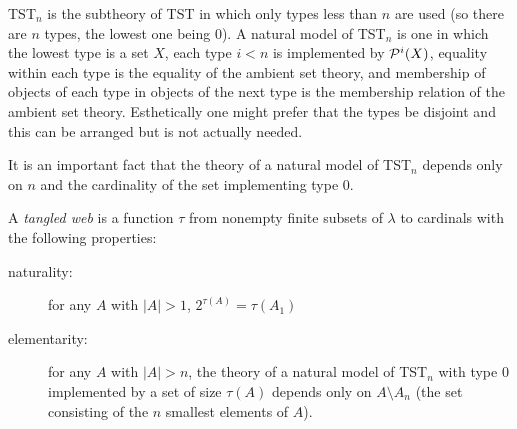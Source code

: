 \documentclass{slides}
\begin{document}
\begin{slide}

TST$_n$ is the subtheory of TST in which only types less than $n$ are used (so there are $n$ types, the lowest one being 0).  A natural model of TST$_n$ is one in which
the lowest type is a set $X$, each type $i<n$ is implemented by ${\cal P}^i(X)$, equality within each type is the equality of the ambient set theory, and membership of objects
of each type in objects of the next type is the membership relation of the ambient set theory.  Esthetically one might prefer that the types be disjoint and this can be arranged but is not actually needed.

It is an important fact that the theory of a natural model of TST$_n$ depends only on $n$ and the cardinality of the set implementing type 0.

\end{slide}

\begin{slide}

A {\em tangled web\/} is a function $\tau$ from nonempty finite subsets of $\lambda$ to cardinals with the following properties:

\begin{description}

\item[naturality:]  for any $A$ with $|A|>1$, $2^{\tau(A)} = \tau(A_1)$

\item[elementarity:]   for any $A$ with $|A|> n$, the theory of a natural model of TST$_n$ with type 0 implemented by a set of size $\tau(A)$ depends only on  $A \setminus A_n$ (the set
consisting of the $n$ smallest elements of $A$).

\end{description}

\end{slide}
\end{document}
